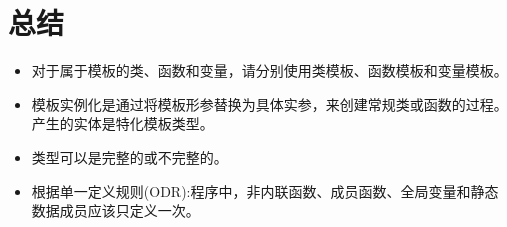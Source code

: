 \section{总结}

\begin{itemize}
\item 
对于属于模板的类、函数和变量，请分别使用类模板、函数模板和变量模板。

\item 
模板实例化是通过将模板形参替换为具体实参，来创建常规类或函数的过程。产生的实体是特化模板类型。

\item 
类型可以是完整的或不完整的。

\item 
根据单一定义规则(ODR):程序中，非内联函数、成员函数、全局变量和静态数据成员应该只定义一次。
\end{itemize}